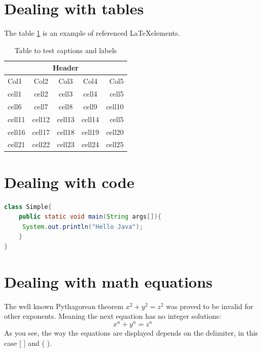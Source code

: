 \documentclass{article}
\begin{document}
\section{Dealing with tables}
The table \ref{table:table1} is an example of referenced \LaTeX elements.
\begin{table}[h]
\centering
\begin{tabular}{ | l | c | c | c | r |}
\hline
\multicolumn{5}{|c|}{Header} \\
\hline
Col1 & Col2 & Col3 & Col4 & Col5 \\ [0.5ex]
\hline
 cell1 & cell2 & cell3 & cell4 & cell5\\ 
 cell6 & cell7 & cell8 & cell9 & cell10\\  
 cell11 & cell12 & cell13 & cell14 & cell5 \\
 cell16 & cell17 & cell18 & cell19 & cell20\\
 cell21 & cell22 & cell23 & cell24 & cell25\\
 \hline
\end{tabular}
\caption{Table to test captions and labels}
\label{table:table1}
\end{table}

\section{Dealing with code}

\begin{lstlisting}[language=Java]
class Simple{  
    public static void main(String args[]){  
     System.out.println("Hello Java");  
    }  
}  
\end{lstlisting}

\section{Dealing with math equations}

The well known Pythagorean theorem \(x^2 + y^2 = z^2\) was 
proved to be invalid for other exponents. 
Meaning the next equation has no integer solutions:
\[ x^n + y^n = z^n \]
As you see, the way the equations are displayed depends on the delimiter, in this case [ ] and ( ).
\end{document}
